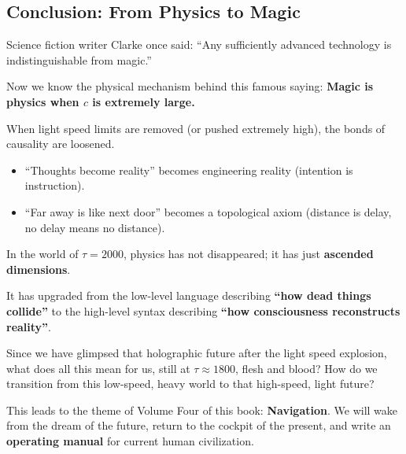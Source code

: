 \subsection{Conclusion: From Physics to Magic}

Science fiction writer Clarke once said: ``Any sufficiently advanced technology is indistinguishable from magic.''

Now we know the physical mechanism behind this famous saying: \textbf{Magic is physics when $c$ is extremely large.}

When light speed limits are removed (or pushed extremely high), the bonds of causality are loosened.

\begin{itemize}
\item ``Thoughts become reality'' becomes engineering reality (intention is instruction).

\item ``Far away is like next door'' becomes a topological axiom (distance is delay, no delay means no distance).
\end{itemize}

In the world of $\tau = 2000$, physics has not disappeared; it has just \textbf{ascended dimensions}.

It has upgraded from the low-level language describing \textbf{``how dead things collide''} to the high-level syntax describing \textbf{``how consciousness reconstructs reality''}.

Since we have glimpsed that holographic future after the light speed explosion, what does all this mean for us, still at $\tau \approx 1800$, flesh and blood? How do we transition from this low-speed, heavy world to that high-speed, light future?

This leads to the theme of Volume Four of this book: \textbf{Navigation}. We will wake from the dream of the future, return to the cockpit of the present, and write an \textbf{operating manual} for current human civilization.

